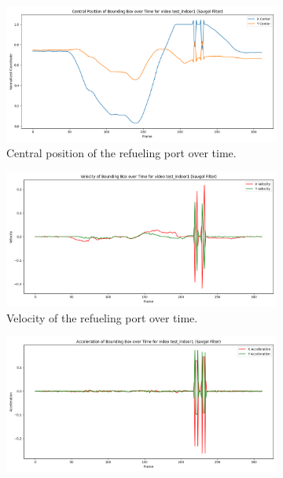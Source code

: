\documentclass[12pt,oneside]{book} %
\begin{document}
\begin{figure}[H]
    \centering
    \begin{subfigure}[t]{0.6\textwidth}
        \includegraphics[width=\textwidth]{figures/bbox_metrics/test_indoor1 (Savgol Filter)_central_position.png}
        \caption{Central position of the refueling port over time.}
        \label{fig:central-position-test-indoor1-savgol}
    \end{subfigure}
    \hfill
    \begin{subfigure}[t]{0.6\textwidth}
        \includegraphics[width=\textwidth]{figures/bbox_metrics/test_indoor1 (Savgol Filter)_velocity.png}
        \caption{Velocity of the refueling port over time.}
        \label{fig:velocity-test-indoor1-savgol}
    \end{subfigure}
    \vfill
    \begin{subfigure}[t]{0.6\textwidth}
        \includegraphics[width=\textwidth]{figures/bbox_metrics/test_indoor1 (Savgol Filter)_acceleration.png}

\end{subfigure}
\end{figure}
\end{document}
